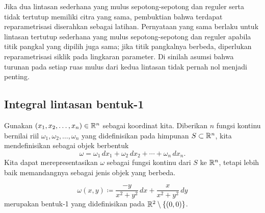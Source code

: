 Jika dua lintasan sederhana yang mulus sepotong-sepotong dan reguler serta tidak tertutup memiliki citra yang sama,
pembuktian bahwa terdapat reparametrisasi diserahkan sebagai latihan.  Pernyataan
yang sama berlaku untuk lintasan tertutup sederhana yang mulus sepotong-sepotong
dan reguler apabila titik pangkal yang dipilih juga sama; jika titik pangkalnya berbeda, diperlukan reparametrisasi siklik
pada lingkaran parameter.  Di sinilah asumsi bahwa turunan pada setiap ruas mulus
dari kedua lintasan tidak pernah nol menjadi penting.

\subsection{Integral lintasan bentuk-1}

\begin{defn}
Gunakan $(x_1,x_2,\ldots,x_n) \in {\mathbb{R}}^n$ sebagai koordinat kita.
Diberikan $n$ fungsi kontinu bernilai riil
$\omega_1,\omega_2,\ldots,\omega_n$ yang didefinisikan pada himpunan $S \subset {\mathbb{R}}^n$,
kita mendefinisikan \emph{}
sebagai objek berbentuk
\begin{equation*}
\omega = \omega_1 \,dx_1 + \omega_2 \,dx_2 + \cdots + \omega_n \,dx_n .
\end{equation*}
Kita dapat merepresentasikan $\omega$ sebagai fungsi kontinu dari $S$ ke ${\mathbb{R}}^n$,
tetapi lebih baik memandangnya sebagai jenis objek yang berbeda.
\end{defn}

\begin{example}
\begin{equation*}
\omega(x,y) \coloneqq \frac{-y}{x^2+y^2} \,dx + \frac{x}{x^2+y^2} \,dy
\end{equation*}
merupakan bentuk-1 yang didefinisikan pada ${\mathbb{R}}^2 \setminus \{ (0,0) \}$.
\end{example}

